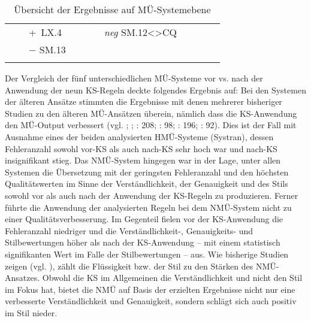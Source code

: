 \begin{sidewaystable}
{\begin{tabular}{lllllllllll}
& & \cellcolor{smGreen}+~LX.4  &  &  & \cellcolor{smGreen} &  \cellcolor{smGreen}\textit{neg} SM.12<>CQ &  &  & \cellcolor{smGreen} & \cellcolor{smGreen}\\
& & \cellcolor{smGreen}$-$ SM.13 & & & \cellcolor{smGreen} & \cellcolor{smGreen} & & & \cellcolor{smGreen} & \cellcolor{smGreen}\\
\lspbottomrule
\end{tabular}
}
\caption{\label{tab:05:100}Übersicht der Ergebnisse auf MÜ-Systemebene   }
\end{sidewaystable}

Der Vergleich der fünf unterschiedlichen MÜ-Systeme vor vs. nach der Anwendung der neun KS-Regeln deckte folgendes Ergebnis auf: Bei den Systemen der älteren Ansätze stimmten die Ergebnisse mit denen mehrerer bisheriger Studien zu den älteren MÜ-Ansätzen überein, nämlich dass die KS-Anwendung den MÜ-Output verbessert (vgl. \citealt{NybergMitamura1996}; \citealt{Bernth1999}; \citealt{BernthGdaniec2001}: 208; \citealt{Drugan2013}: 98; \citealt{DrewerZiegler2014}: 196; \citealt{Wittkowsky2017}: 92). Dies ist der Fall mit Ausnahme eines der beiden analysierten HMÜ-Systeme (Systran), dessen Fehleranzahl sowohl vor-KS als auch nach-KS sehr hoch war und nach-KS insignifikant stieg. Das NMÜ-System hingegen war in der Lage, unter allen Systemen die Übersetzung mit der geringsten Fehleranzahl und den höchsten Qualitätswerten im Sinne der Verständlichkeit, der Genauigkeit und des Stils sowohl vor als auch nach der Anwendung der KS-Regeln zu produzieren. Ferner führte die Anwendung der analysierten Regeln bei dem NMÜ-System nicht zu einer Qualitätsverbesserung. Im Gegenteil fielen vor der KS-Anwendung die Fehleranzahl niedriger und die Verständlichkeit\nobreakdash-, Genauigkeits- und Stilbewertungen höher als nach der KS-Anwendung -- mit einem statistisch signifikanten Wert im Falle der Stilbewertungen -- aus. Wie bisherige Studien zeigen (vgl. \citealt{ToralSanchez-Cartagena2017}), zählt die Flüssigkeit bzw. der Stil zu den Stärken des NMÜ-Ansatzes. Obwohl die KS im Allgemeinen die Verständlichkeit und nicht den Stil im Fokus hat, bietet die NMÜ auf Basis der erzielten Ergebnisse nicht nur eine verbesserte Verständlichkeit und Genauigkeit, sondern schlägt sich auch positiv im Stil nieder.
